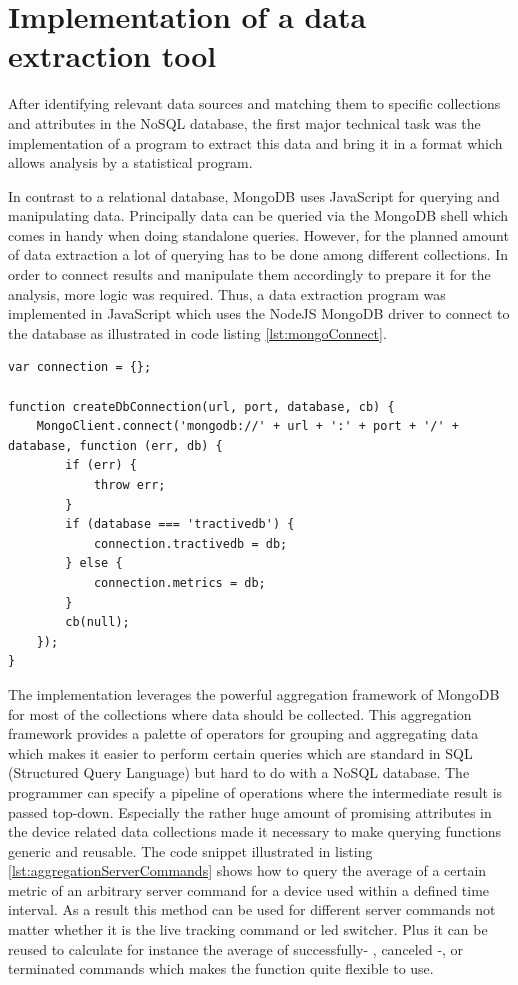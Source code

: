 \section{Implementation of a data extraction tool}
\label{sec:extractionTool}
After identifying relevant data sources and matching them to specific collections and attributes in the NoSQL database, the first major technical task was the implementation of a program to extract this data and bring it in a format which allows analysis by a statistical program. 

In contrast to a relational database, MongoDB uses JavaScript for querying and manipulating data. Principally data can be queried via the MongoDB shell which comes in handy when doing standalone queries. However, for the planned amount of data extraction a lot of querying has to be done among different collections. In order to connect results and manipulate them accordingly to prepare it for the analysis, more logic was required. Thus, a data extraction program was implemented in JavaScript which uses the NodeJS MongoDB driver to connect to the database as illustrated in code listing \ref{lst:mongoConnect}.

\begin{lstlisting}[caption={Connecting to the database via MongoDB NodeJS driver}, label={lst:mongoConnect}]
var connection = {};

function createDbConnection(url, port, database, cb) {
	MongoClient.connect('mongodb://' + url + ':' + port + '/' + database, function (err, db) {
		if (err) {
			throw err;
		}
		if (database === 'tractivedb') {
			connection.tractivedb = db;
		} else {
			connection.metrics = db;
		}
		cb(null);
	});
}
\end{lstlisting}

The implementation leverages the powerful aggregation framework of MongoDB for most of the collections where data should be collected. This aggregation framework provides a palette of operators for grouping and aggregating data which makes it easier to perform certain queries which are standard in SQL (Structured Query Language) but hard to do with a NoSQL database. The programmer can specify a pipeline of operations where the intermediate result is passed top-down. Especially the rather huge amount of promising attributes in the device related data collections made it necessary to make querying functions generic and reusable. The code snippet illustrated in listing \ref{lst:aggregationServerCommands} shows how to query the average of a certain metric of an arbitrary server command for a device used within a defined time interval. As a result this method can be used for different server commands not matter whether it is the live tracking command or led switcher. Plus it can be reused to calculate for instance the average of successfully- , canceled -, or terminated commands which makes the function quite flexible to use. 

